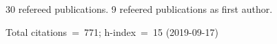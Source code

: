 30 refereed publications. 9 refeered publications as first author.

Total citations~=~771; h-index~=~15 (2019-09-17)